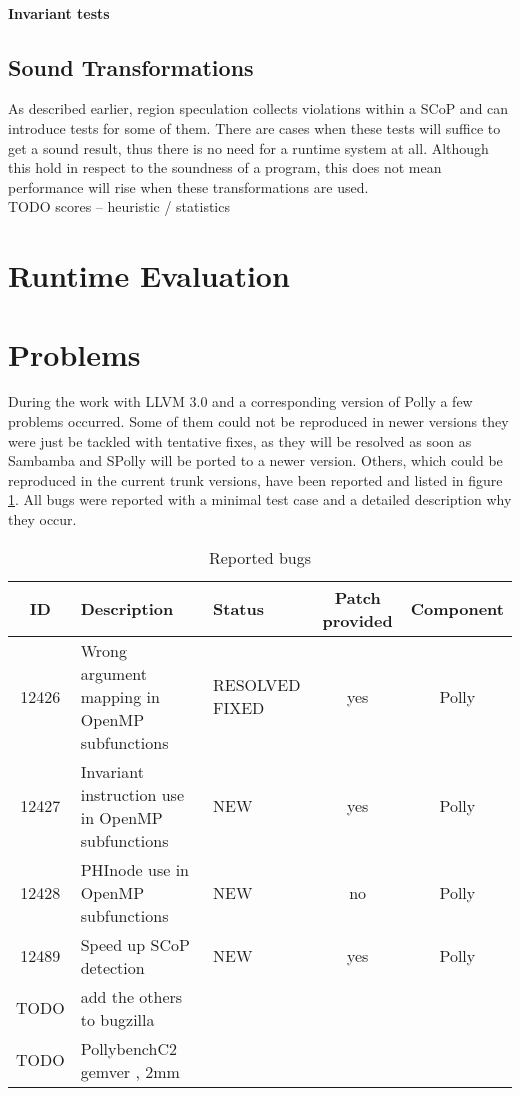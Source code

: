 \paragraph{Invariant tests}




\subsection{Sound Transformations}
\label{soundCTtransformations}
As described earlier, region speculation collects violations within a SCoP 
and can introduce tests for some of them. There are cases when these tests will
suffice to get a sound result, thus there is no need for a runtime system at all.
Although this hold in respect to the soundness of a program, this does not mean 
performance will rise when these transformations are used.  \\
TODO scores -- heuristic / statistics 


\section{Runtime Evaluation}


\section{Problems}
During the work with LLVM 3.0 and a corresponding version of Polly a few
problems occurred. Some of them could not be reproduced in newer versions
they were just be tackled with tentative fixes, as they will be resolved as soon
as Sambamba and SPolly will be ported to a newer version.
Others, which could be reproduced in the current trunk versions,
have been reported and listed in figure \ref{tab:bugreports}. All bugs were 
reported with a minimal test case and a detailed description why they occur.

\begin{table}[htbp]
  \caption{Reported bugs}
  \begin{tabularx}{0.9\textwidth}{ c | X | p{2cm} | c | c }
   ID & Description & Status & Patch provided  & Component \\
  \hline \hline
  12426 & Wrong argument mapping in OpenMP subfunctions & RESOLVED FIXED & yes & Polly \\
   \hline
  12427 & Invariant instruction use in OpenMP subfunctions & NEW & yes & Polly \\
   \hline
  12428 & PHInode use in OpenMP subfunctions & NEW & no & Polly \\
   \hline
  12489 & Speed up SCoP detection & NEW & yes & Polly \\
  TODO & add the others to bugzilla & & & \\
  TODO & PollybenchC2 gemver , 2mm & & & \\
  \end{tabularx}
  \label{tab:bugreports}
\end{table}
